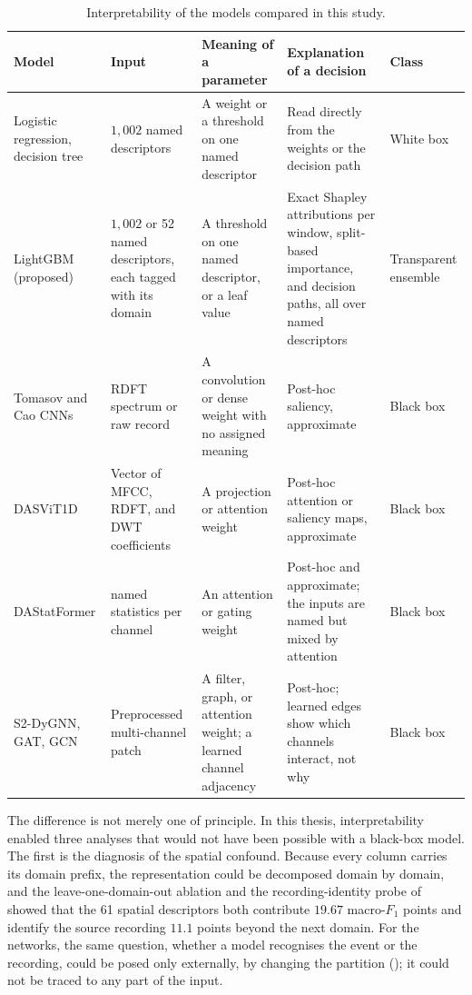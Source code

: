 \begin{table}[!htbp]
	\centering
	\caption{Interpretability of the models compared in this study.}
	\label{tab:whitebox}
	\footnotesize
	\setlength{\tabcolsep}{4pt}
	\renewcommand{\arraystretch}{1.15}
	\begin{tabularx}{\textwidth}{@{}>{\raggedright\arraybackslash}p{2.5cm} >{\raggedright\arraybackslash}X >{\raggedright\arraybackslash}X >{\raggedright\arraybackslash}X >{\raggedright\arraybackslash}p{1.75cm}@{}}
		\toprule
		\textbf{Model} & \textbf{Input} & \textbf{Meaning of a parameter} & \textbf{Explanation of a decision} & \textbf{Class}\\
		\midrule
		Logistic regression, decision tree & $1{,}002$ named descriptors & A weight or a threshold on one named descriptor & Read directly from the weights or the decision path & White box\\
		\addlinespace[3pt]
		LightGBM (proposed) & $1{,}002$ or 52 named descriptors, each tagged with its domain & A threshold on one named descriptor, or a leaf value & Exact Shapley attributions per window, split-based importance, and decision paths, all over named descriptors & Transparent ensemble\\
		\addlinespace[3pt]
		Tomasov and Cao CNNs & RDFT spectrum or raw record & A convolution or dense weight with no assigned meaning & Post-hoc saliency, approximate & Black box\\
		\addlinespace[3pt]
		DASViT1D & Vector of MFCC, RDFT, and DWT coefficients & A projection or attention weight & Post-hoc attention or saliency maps, approximate & Black box\\
		\addlinespace[3pt]
		DAStatFormer & 24 named statistics per channel & An attention or gating weight & Post-hoc and approximate; the inputs are named but mixed by attention & Black box\\
		\addlinespace[3pt]
		S2-DyGNN, GAT, GCN & Preprocessed multi-channel patch & A filter, graph, or attention weight; a learned channel adjacency & Post-hoc; learned edges show which channels interact, not why & Black box\\
		\bottomrule
	\end{tabularx}
\end{table}

The difference is not merely one of principle. In this thesis, interpretability enabled three analyses that would not have been possible with a black-box model. The first is the diagnosis of the spatial confound. Because every column carries its domain prefix, the representation could be decomposed domain by domain, and the leave-one-domain-out ablation and the recording-identity probe of  showed that the 61 spatial descriptors both contribute $19.67$ macro-$F_1$ points and identify the source recording $11.1$ points beyond the next domain. For the networks, the same question, whether a model recognises the event or the recording, could be posed only externally, by changing the partition (); it could not be traced to any part of the input.

